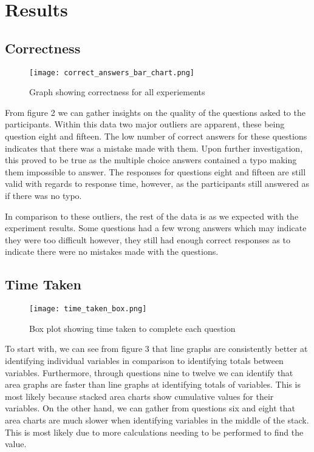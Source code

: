 \section{Results}
\subsection*{Correctness}
\begin{figure}[H]
    \centering
    \texttt{[image: correct\_answers\_bar\_chart.png]}
    \caption{Graph showing correctness for all experiements}
\end{figure}
\begin{flushleft}
    From figure 2 we can gather insights on the quality of the questions asked to the participants.
    Within this data two major outliers are apparent, these being question eight and fifteen. The low number of 
    correct answers for these questions indicates that there was a mistake made with them. Upon further investigation,
    this proved to be true as the multiple choice answers contained a typo making them impossible to answer. The responses for questions eight and fifteen 
    are still valid with regards to response time, however, as the participants still answered as if there was no typo.

    In comparison to these outliers, the rest of the data is as we expected with the experiment results. Some questions had a few wrong answers which may indicate they were too difficult
    however, they still had enough correct responses as to indicate there were no mistakes made with the questions.
\end{flushleft}

\subsection*{Time Taken}
\begin{figure}[H]
    \centering
    \texttt{[image: time\_taken\_box.png]}
    \caption{Box plot showing time taken to complete each question}
\end{figure}
\begin{flushleft}
    To start with, we can see from figure 3 that line graphs are consistently better at identifying individual variables in comparison to identifying totals between variables.
    Furthermore, through questions nine to twelve we can identify that area graphs are faster than line graphs at identifying totals of variables. This is most likely because stacked 
    area charts show cumulative values for their variables. On the other hand, we can gather from questions six and eight that area charts are much slower when identifying variables in the middle of
    the stack. This is most likely due to more calculations needing to be performed to find the value.
\end{flushleft}

